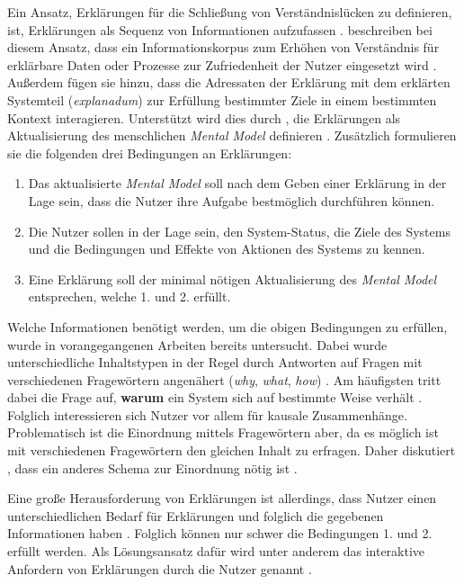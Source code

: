 Ein Ansatz, Erklärungen für die Schließung von Verständnislücken zu definieren, ist, Erklärungen als Sequenz von Informationen aufzufassen \cite[vgl.][]{wang_integration_2020}. \citeauthor{sovrano_modelling_2020} beschreiben bei diesem Ansatz, dass ein Informationskorpus zum Erhöhen von Verständnis für erklärbare Daten oder Prozesse zur Zufriedenheit der Nutzer eingesetzt wird \cite[übersetzt vgl.][]{sovrano_modelling_2020}. Außerdem fügen sie hinzu, dass die Adressaten der Erklärung mit dem erklärten Systemteil (\textit{explanadum}) zur Erfüllung bestimmter Ziele in einem bestimmten Kontext interagieren. Unterstützt wird dies durch \citeauthor{zahedi_towards_2019}, die Erklärungen als \glqq Aktualisierung des menschlichen \textit{Mental Model}\grqq{} definieren \cite[übersetzt vgl.][]{zahedi_towards_2019}. Zusätzlich formulieren sie die folgenden drei Bedingungen an Erklärungen:
\begin{enumerate}
    \item Das aktualisierte \textit{Mental Model} soll nach dem Geben einer Erklärung in der Lage sein, dass die Nutzer ihre Aufgabe bestmöglich durchführen können.
    \item Die Nutzer sollen in der Lage sein, den System-Status, die Ziele des Systems und die Bedingungen und Effekte von Aktionen des Systems zu kennen.
    \item Eine Erklärung soll der minimal nötigen Aktualisierung des \textit{Mental Model} entsprechen, welche 1. und 2. erfüllt.
\end{enumerate}

Welche Informationen benötigt werden, um die obigen Bedingungen zu erfüllen, wurde in vorangegangenen Arbeiten bereits untersucht. Dabei wurde unterschiedliche Inhaltstypen in der Regel durch Antworten auf Fragen mit verschiedenen Fragewörtern angenähert (\textit{why}, \textit{what}, \textit{how}) \cite{rosenfeld_explainability_2019}. Am häufigsten tritt dabei die Frage auf, \textbf{warum} ein System sich auf bestimmte Weise verhält \cite{chazette2020explainability}. Folglich interessieren sich Nutzer vor allem für kausale Zusammenhänge. Problematisch ist die Einordnung mittels Fragewörtern aber, da es möglich ist mit verschiedenen Fragewörtern den gleichen Inhalt zu erfragen. Daher diskutiert \citeauthor{wang_integration_2020}, dass ein anderes Schema zur Einordnung nötig ist \cite{wang_integration_2020}.

Eine große Herausforderung von Erklärungen ist allerdings, dass Nutzer einen unterschiedlichen Bedarf für Erklärungen und folglich die gegebenen Informationen haben \cite{chazette2020explainability}. Folglich können nur schwer die Bedingungen 1. und 2. erfüllt werden. Als Lösungsansatz dafür wird unter anderem das interaktive Anfordern von Erklärungen durch die Nutzer genannt \cite{chazette_end-users_nodate}.

